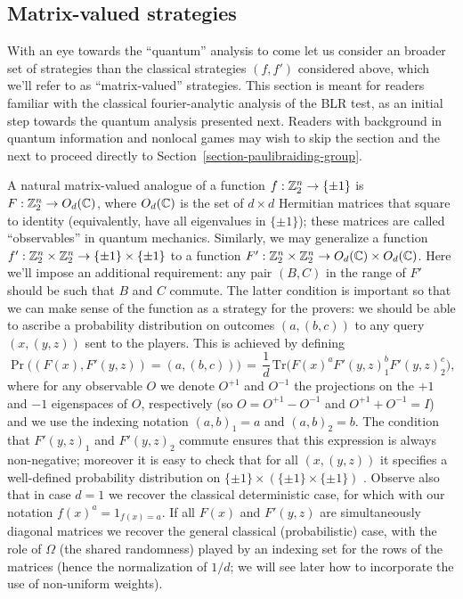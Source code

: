 \subsection{Matrix-valued strategies}

With an eye towards the ``quantum'' analysis to come let us consider an broader set of strategies than the classical strategies $(f,f')$ considered above, which we'll refer to as ``matrix-valued'' strategies. This section is meant for readers familiar with the classical fourier-analytic analysis of the BLR test, as an initial step towards the quantum analysis presented next. Readers with background in quantum information and nonlocal games may wish to skip the section and the next to proceed directly to Section~\ref{section-paulibraiding-group}. 

A natural matrix-valued analogue of a function $f:\mathbb{Z}_2^n \to \{\pm 1\}$ is $F:\mathbb{Z}_2^n \to O_d(\mathbb{C})$, where $O_d(\mathbb{C})$ is the set of $d\times d$ Hermitian matrices that square to identity (equivalently, have all eigenvalues in $\{\pm 1\}$); these matrices are called ``observables'' in quantum mechanics. Similarly, we may generalize a function  $f':\mathbb{Z}_2^n \times \mathbb{Z}_2^n \to \{\pm 1 \} \times \{\pm 1\}$ to a function  $F':\mathbb{Z}_2^n \times \mathbb{Z}_2^n \to O_d(\mathbb{C}) \times O_d(\mathbb{C})$. Here we'll impose an additional requirement: any pair $(B,C)$ in the range of $F'$ should be such that $B$ and $C$ commute. The latter condition is important so that we can make sense of the function as a strategy for the provers: we should be able to ascribe a probability distribution on outcomes $(a,(b,c))$ to any query $(x,(y,z))$ sent to the players. This is achieved by defining 
\begin{equation}\label{eq:matrixprob}
\Pr\big((F(x), F'(y,z))=(a,(b,c))\big)\,=\,\frac{1}{d}\,\mathrm{Tr}\big( F(x)^aF'(y,z)_1^b F'(y,z)_2^c\big),
\end{equation}
where for any observable $O$ we denote $O^{+1}$ and $O^{-1}$ the projections on the $+1$ and $-1$ eigenspaces of $O$, respectively (so $O=O^{+1}-O^{-1}$ and $O^{+1}+O^{-1}=I$) and we use the indexing notation $(a,b)_1=a$ and $(a,b)_2=b$. The condition that $F'(y,z)_1$ and $F'(y,z)_2$ commute ensures that this expression is always non-negative; moreover it is easy to check that for all $(x,(y,z))$ it specifies a well-defined probability distribution on $\{\pm 1\}\times (\{\pm1\}\times \{\pm1\})$ . Observe also that in case $d=1$ we recover the classical deterministic case, for which with our notation $f(x)^a = 1_{f(x)=a}$. If all $F(x)$ and $F'(y,z)$ are simultaneously diagonal matrices we recover the general classical (probabilistic) case, with the role of $\Omega$ (the shared randomness) played by an indexing set for the rows of the matrices (hence the normalization of $1/d$; we will see later how to incorporate the use of non-uniform weights). 

